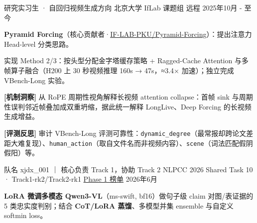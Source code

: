 \vspace{-3mm}
\vspace{-3mm}
\begin{cventries}
  \cventry
    {研究实习生 · 自回归视频生成方向} %
    {北京大学 IfLab 课题组} %
    {远程} %
    {2025年10月 - 至今} %
    {
      \vspace{-4mm}
      \begin{cvitems}
        \item {\textbf{Pyramid Forcing}（核心贡献者·\href{https://github.com/IF-LAB-PKU/Pyramid-Forcing}{IF-LAB-PKU/Pyramid-Forcing}）：提出注意力 Head-level 分类思路。}
        \item {实现 Method 2/3：按头型分配金字塔缓存策略 + Ragged-Cache Attention 与多帧算子融合（H200 上 30 秒视频推理 160s → 47s，≈3.4× 加速）；独立完成 VBench-Long 实验。}
        \item {\textbf{[机制洞察]} 从 RoPE 周期性视角解释长视频 attention collapse：首帧 sink 与周期性误判邻近帧叠加成双重坍缩，据此统一解释 LongLive、Deep Forcing 的长视频生成增益。}
        \item {\textbf{[评测反思]} 审计 VBench-Long 评测可靠性：\texttt{dynamic\_degree}（最常报却跨论文差距大难复现）、\texttt{human\_action}（取自文件名而非视频内容）、\texttt{scene}（词法匹配假阴假阳）等。}
      \end{cvitems}
    }
  \cventry
    {队名 xjdx\_001 ｜ 核心负责 Track 1，协助 Track 2} %
    {NLPCC 2026 Shared Task 10 · Track1-rk2/Track2-rk1} %
    {\href{https://nlp2ct.github.io/NLPCC-2026-Task10-Science/leaderboard.html}{Phase 1 榜单}} %
    {2026年6月} %
    {
      \vspace{-4mm}
      \begin{cvitems}
        \item {\textbf{LoRA 微调多模态 Qwen3-VL}（ms-swift, bf16）做句子级 claim 对图/表证据的 5 类忠实度判别；结合 \textbf{CoT/LoRA 蒸馏}、多模型并集 ensemble 与自定义 softmin loss。}
      \end{cvitems}
    }
\end{cventries}
